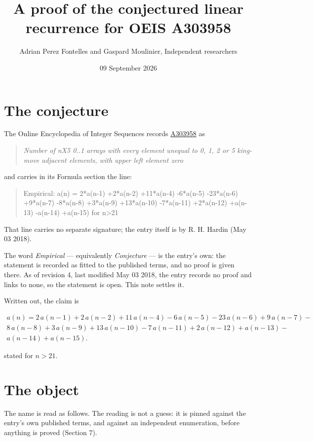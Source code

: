 \documentclass[11pt]{article}
\title{A proof of the conjectured linear recurrence for OEIS A303958}
\author{Adrian Perez Fontelles and Gaspard Moulinier, Independent researchers}
\date{09 September 2026}
\theoremstyle{definition}
\begin{document}
\maketitle
\section{The conjecture}

The Online Encyclopedia of Integer Sequences records \href{https://oeis.org/A303958}{A303958} as

\begin{quote}\itshape Number of nX5 0..1 arrays with every element unequal to 0, 1, 2 or 5 king-move adjacent elements, with upper left element zero\end{quote}

and carries in its Formula section the line:

\begin{quote}\ttfamily Empirical: a(n) = 2*a(n-1) +2*a(n-2) +11*a(n-4) -6*a(n-5) -23*a(n-6) +9*a(n-7) -8*a(n-8) +3*a(n-9) +13*a(n-10) -7*a(n-11) +2*a(n-12) +a(n-13) -a(n-14) +a(n-15) for n>21\end{quote}

That line carries no separate signature; the entry itself is by R. H. Hardin (May 03 2018).

The word {\itshape Empirical} --- equivalently {\itshape Conjecture} --- is the entry's own: the statement is recorded as fitted to the published terms, and no proof is given there. As of revision 4, last modified May 03 2018, the entry records no proof and links to none, so the statement is open. This note settles it.

Written out, the claim is

\begin{multline*} a(n) = 2\,a(n-1) + 2\,a(n-2) + 11\,a(n-4) - 6\,a(n-5) - 23\,a(n-6) + 9\,a(n-7) - \\ 8\,a(n-8) + 3\,a(n-9) + 13\,a(n-10) - 7\,a(n-11) + 2\,a(n-12) + a(n-13) - \\ a(n-14) + a(n-15). \end{multline*}

stated for $n > 21$.

\section{The object}

The name is read as follows. The reading is not a guess: it is pinned against the entry's own published terms, and against an independent enumeration, before anything is proved (Section 7).
\end{document}
